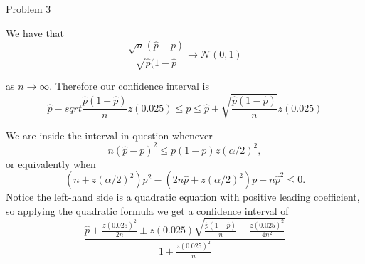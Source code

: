 \documentclass{article}
\begin{document}
\begin{question}{Problem 3}
    \begin{part}
        We have that 
        \[\frac{\sqrt{n}(\hat{p}-p)}{\sqrt{\hat{p}(1-\hat{p}}}\to\mathcal{N}(0,1)\]
    \end{part}
    as $n\to\infty$. Therefore our confidence interval is
    \[\hat{p}-sqrt{\frac{\hat{p}(1-\hat{p})}{n}}z(0.025)\leq p\leq \hat{p}+\sqrt{\frac{\hat{p}(1-\hat{p})}{n}}z(0.025)\]
    \begin{part}
        We are inside the interval in question whenever 
        \[n(\hat{p}-p)^2 \leq p(1-p)z(\alpha/2)^2, \]
        or equivalently when 
        \[(n+z(\alpha/2)^2)p^2 - (2n\hat{p}+z(\alpha/2)^2)p + n\hat{p}^2\leq 0. \]
        Notice the left-hand side is a quadratic equation with positive leading coefficient, so applying the quadratic formula we get a confidence interval of 
        \[\frac{\hat{p}+\frac{z(0.025)^2}{2n}\pm z(0.025)\sqrt{\frac{\hat{p}(1-\hat{p})}{n}+\frac{z(0.025)^2}{4n^2}}}{1+\frac{z(0.025)^2}{n}}\]
    \end{part}
\end{question}

\end{document}
